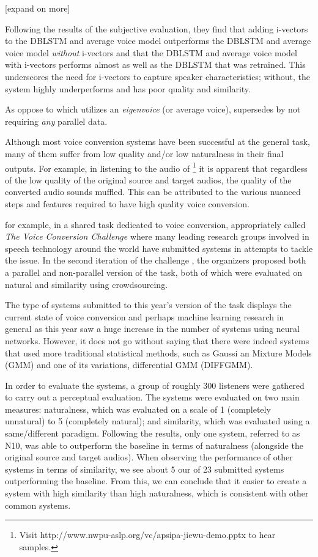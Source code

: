 \documentclass
[
    a4paper,
    twoside,
    12pt
]
{report}
\begin{document}
{[}expand on \textcite{wu2016} more{]}

Following the results of the subjective evaluation, they find that
adding i-vectors to the DBLSTM and average voice model outperforms the
DBLSTM and average voice model \emph{without} i-vectors and that the
DBLSTM and average voice model with i-vectors performs almost as well as
the DBLSTM that was retrained. This underscores the need for i-vectors
to capture speaker characteristics; without, the system highly
underperforms and has poor quality and similarity.

As oppose to \textcite{wu2016} which utilizes an \emph{eigenvoice} (or
average voice), \textcite{kinnunen2017} supersedes \textcite{wu2016} by
not requiring \emph{any} parallel data.

Although most voice conversion systems have been successful at the
general task, many of them suffer from low quality and/or low
naturalness in their final outputs. For example, in listening to the
audio of
\textcite{wu2016}\footnote{Visit http://www.nwpu-aslp.org/vc/apsipa-jiewu-demo.pptx to hear samples.}
it is apparent that regardless of the low quality of the original source
and target audios, the quality of the converted audio sounds muffled.
This can be attributed to the various nuanced steps and features
required to have high quality voice conversion.

for example, in a shared task dedicated to voice conversion,
appropriately called \emph{The Voice Conversion Challenge} where many
leading research groups involved in speech technology around the world
have submitted systems in attempts to tackle the issue. In the second
iteration of the challenge \textcite{lorenzo-trueba2018}, the organizers
proposed both a parallel and non-parallel version of the task, both of
which were evaluated on natural and similarity using crowdsourcing.

The type of systems submitted to this year's version of the task
displays the current state of voice conversion and perhaps machine
learning research in general as this year saw a huge increase in the
number of systems using neural networks. However, it does not go without
saying that there were indeed systems that used more traditional
statistical methods, such as Gaussi an Mixture Models (GMM) and one of
its variations, differential GMM (DIFFGMM).

In order to evaluate the systems, a group of roughly 300 listeners were
gathered to carry out a perceptual evaluation. The systems were
evaluated on two main measures: naturalness, which was evaluated on a
scale of 1 (completely unnatural) to 5 (completely natural); and
similarity, which was evaluated using a same/different paradigm.
Following the results, only one system, referred to as N10, was able to
outperform the baseline in terms of naturalness (alongside the original
source and target audios). When observing the performance of other
systems in terms of similarity, we see about 5 our of 23 submitted
systems outperforming the baseline. From this, we can conclude that it
easier to create a system with high similarity than high naturalness,
which is consistent with other common systems.
\end{document}
